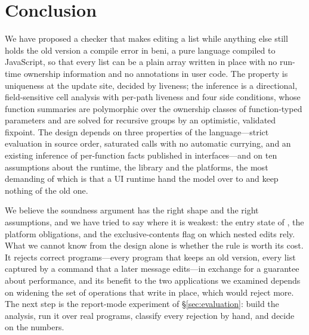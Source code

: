 \section{Conclusion}
\label{sec:conclusion}

We have proposed a checker that makes editing a list while anything else still holds the old version a
compile error in beni, a pure language compiled to JavaScript, so that every list can be a plain array
written in place with no run-time ownership information and no annotations in user code. The property is
uniqueness at the update site, decided by liveness; the inference is a directional, field-sensitive cell
analysis with per-path liveness and four side conditions, whose function summaries are polymorphic over
the ownership classes of function-typed parameters and are solved for recursive groups by an optimistic,
validated fixpoint. The design depends on three properties of the language---strict evaluation in source
order, saturated calls with no automatic currying, and an existing inference of per-function facts
published in interfaces---and on ten assumptions about the runtime, the library and the platforms, the
most demanding of which is that a UI runtime hand the model over to  and keep nothing of the
old one.

We believe the soundness argument has the right shape and the right assumptions, and we have tried to say
where it is weakest: the entry state of , the platform obligations, and the exclusive-contents
flag on which nested edits rely. What we cannot know from the design alone is whether the rule is worth
its cost. It rejects correct programs---every program that keeps an old version, every list captured by a
command that a later message edits---in exchange for a guarantee about performance, and its benefit to the
two applications we examined depends on widening the set of operations that write in place, which would
reject more. The next step is the report-mode experiment of \S\ref{sec:evaluation}: build the analysis,
run it over real programs, classify every rejection by hand, and decide on the numbers.
